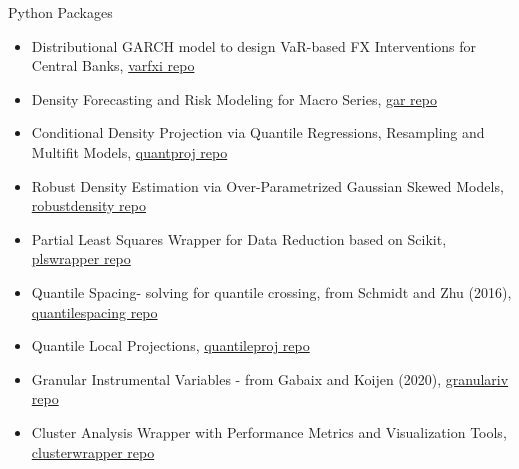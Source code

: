 \documentclass[usegeometry, 10pt, a4paper]{cv} %
\begin{document}
\begin{rubriquetableau}[0.95\textwidth]{Python Packages}\\
  \vspace{-0.8cm}
  
\begin{itemize}
\item Distributional GARCH model to design VaR-based FX Interventions for Central Banks, \href{https://github.com/romainlafarguette/varfxi}{varfxi repo} 
\item Density Forecasting and Risk Modeling for Macro Series, \href{https://github.com/IMFGAR/GaR}{gar repo}
\item Conditional Density Projection via Quantile Regressions, Resampling and Multifit Models, \href{https://github.com/romainlafarguette/gar}{quantproj repo}
\item Robust Density Estimation via Over-Parametrized Gaussian Skewed Models, \href{https://github.com/romainlafarguette/robustdensity}{robustdensity repo}
\item Partial Least Squares Wrapper for Data Reduction based on Scikit, \href{https://github.com/romainlafarguette/plswrapper}{plswrapper repo}
\item Quantile Spacing- solving for quantile crossing, from Schmidt and Zhu (2016), \href{https://github.com/romainlafarguette/quantilespacing}{quantilespacing repo}
\item Quantile Local Projections, \href{https://github.com/romainlafarguette/quantileproj}{quantileproj repo}
\item Granular Instrumental Variables - from Gabaix and Koijen (2020), \href{https://github.com/romainlafarguette/granulariv}{granulariv repo}
\item Cluster Analysis Wrapper with Performance Metrics and Visualization Tools, \href{https://github.com/romainlafarguette/clusterwrapper}{clusterwrapper repo}
\end{itemize}  

\end{rubriquetableau}

\end{document}
